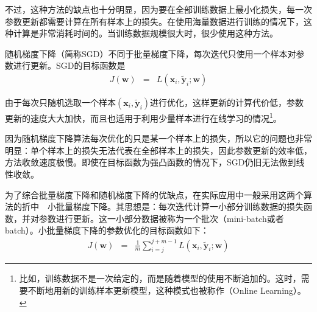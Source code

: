 \parinterval 不过，这种方法的缺点也十分明显，因为要在全部训练数据上最小化损失，每一次参数更新都需要计算在所有样本上的损失。在使用海量数据进行训练的情况下，这种计算是非常消耗时间的。当训练数据规模很大时，很少使用这种方法。

%

\vspace{0.5em}
\vspace{0.5em}

\parinterval 随机梯度下降（简称SGD）不同于批量梯度下降，每次迭代只使用一个样本对参数进行更新。SGD的目标函数是
\begin{eqnarray}
J(\mathbf w)&=&L(\mathbf x_i,\mathbf {\widetilde y}_i;\mathbf w)
\label{eq:5-31}
\end{eqnarray}

\noindent 由于每次只随机选取一个样本$(\mathbf x_i,\mathbf {\widetilde y}_i)$进行优化，这样更新的计算代价低，参数更新的速度大大加快，而且也适用于利用少量样本进行在线学习的情况\footnote{比如，训练数据不是一次给定的，而是随着模型的使用不断追加的。这时，需要不断地用新的训练样本更新模型，这种模式也被称作{\scriptsize{}}（Online Learning）。}。

\parinterval 因为随机梯度下降算法每次优化的只是某一个样本上的损失，所以它的问题也非常明显：单个样本上的损失无法代表在全部样本上的损失，因此参数更新的效率低，方法收敛速度极慢。即使在目标函数为强凸函数的情况下，SGD仍旧无法做到线性收敛。

%

\vspace{0.5em}
\vspace{0.5em}

\parinterval 为了综合批量梯度下降和随机梯度下降的优缺点，在实际应用中一般采用这两个算法的折中\ \dash \ 小批量梯度下降。其思想是：每次迭代计算一小部分训练数据的损失函数，并对参数进行更新。这一小部分数据被称为一个批次（mini-batch或者batch）。小批量梯度下降的参数优化的目标函数如下：
\begin{eqnarray}
J(\mathbf w)&=&\frac{1}{m}\sum_{i=j}^{j+m-1}{L(\mathbf x_i,\mathbf {\widetilde y}_i;\mathbf w)}
\label{eq:5-32}
\end{eqnarray}

